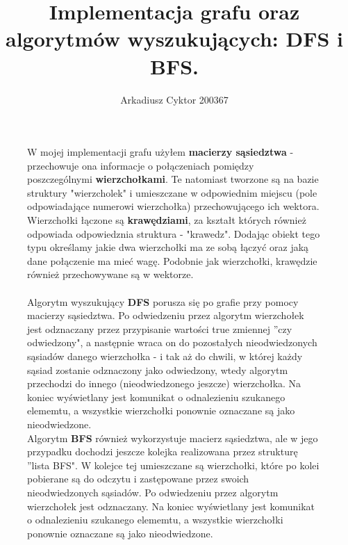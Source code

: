 \documentclass[a4paper,11pt]{report}
\title{Implementacja grafu oraz algorytmów wyszukujących: DFS i BFS.}
\author{Arkadiusz Cyktor 200367}
\begin{document}
\maketitle


\begin{figure}
  W mojej implementacji grafu użyłem \textbf{macierzy sąsiedztwa} - przechowuje ona informacje o połączeniach pomiędzy poszczególnymi \textbf{wierzchołkami}. Te natomiast tworzone są na bazie struktury "wierzcholek" i umieszczane w odpowiednim  miejscu (pole odpowiadające numerowi wierzchołka) przechowującego ich wektora.
\\Wierzchołki łączone są \textbf{krawędziami}, za kształt których również odpowiada odpowiedznia struktura - "krawedz". Dodając obiekt tego typu określamy jakie dwa wierzchołki ma ze sobą łączyć oraz jaką dane połączenie ma mieć wagę. Podobnie jak wierzchołki, krawędzie również przechowywane są w wektorze.
\\
\\Algorytm wyszukujący \textbf{DFS} porusza się po grafie przy pomocy macierzy sąsiedztwa. Po odwiedzeniu przez algorytm wierzchołek jest odznaczany przez przypisanie wartości true zmiennej ''czy odwiedzony", a następnie wraca on do pozostałych nieodwiedzonych sąsiadów danego wierzchołka - i tak aż do chwili, w której każdy sąsiad zostanie odznaczony jako odwiedzony, wtedy algorytm przechodzi do innego (nieodwiedzonego jeszcze) wierzchołka. Na koniec wyświetlany jest komunikat o odnalezieniu szukanego elememtu, a wszystkie wierzchołki ponownie oznaczane są jako nieodwiedzone.
\\Algorytm \textbf{BFS} również wykorzystuje macierz sąsiedztwa, ale w jego przypadku dochodzi jeszcze kolejka realizowana przez strukturę ''lista BFS". W kolejce tej umieszczane są wierzchołki, które po kolei pobierane są do odczytu i zastępowane przez swoich nieodwiedzonych sąsiadów. Po odwiedzeniu przez algorytm wierzchołek jest odznaczany. Na koniec wyświetlany jest komunikat o odnalezieniu szukanego elememtu, a wszystkie wierzchołki ponownie oznaczane są jako nieodwiedzone.
\end{figure}
\end{document}
